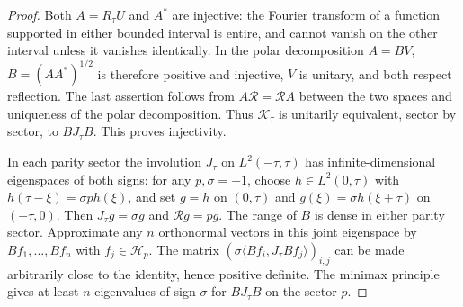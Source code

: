 \begin{proof}
Both $A=R_\tau U$ and $A^*$ are injective: the Fourier transform of a
function supported in either bounded interval is entire, and cannot vanish
on the other interval unless it vanishes identically.  In the polar
decomposition $A=BV$, $B=(AA^*)^{1/2}$ is therefore positive and injective,
$V$ is unitary, and both respect reflection.  The last assertion follows
from $A\mathcal R=\mathcal R A$ between the two spaces and uniqueness of
the polar decomposition.  Thus $\mathcal K_\tau$ is unitarily equivalent,
sector by sector, to $BJ_\tau B$.  This proves injectivity.

In each parity sector the involution $J_\tau$ on $L^2(-\tau,\tau)$ has
infinite-dimensional eigenspaces of both signs: for any $p,\sigma=\pm1$,
choose $h\in L^2(0,\tau)$ with $h(\tau-\xi)=\sigma p h(\xi)$, and set
$g=h$ on $(0,\tau)$ and $g(\xi)=\sigma h(\xi+\tau)$ on $(-\tau,0)$.
Then $J_\tau g=\sigma g$ and $\mathcal Rg=pg$.  The range of $B$ is dense
in either parity sector.  Approximate any $n$ orthonormal vectors in this
joint eigenspace by $Bf_1,\ldots,Bf_n$ with $f_j\in\mathcal H_p$.  The matrix
$(\sigma\langle Bf_i,J_\tau Bf_j\rangle)_{i,j}$ can be made arbitrarily close
to the identity, hence positive definite.  The minimax principle gives at
least $n$ eigenvalues of sign $\sigma$ for $BJ_\tau B$ on the sector $p$.


\end{proof}
